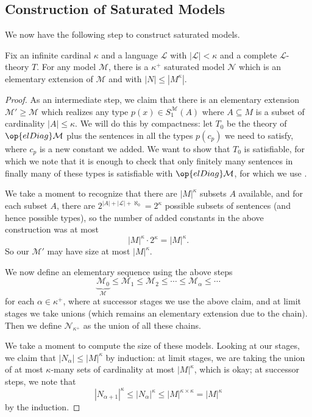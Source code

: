 \documentclass[../notes.tex]{subfiles}
\begin{document}
\subsection{Construction of Saturated Models}
We now have the following step to construct saturated models.
\begin{lemma} \label{lem:almost-saturated-model}
	Fix an infinite cardinal $\kappa$ and a language $\mathcal L$ with $\left|\mathcal L\right|<\kappa$ and a complete $\mathcal L$-theory $T$. For any model $\mathcal M$, there is a $\kappa^+$ saturated model $\mathcal N$ which is an elementary extension of $\mathcal M$ and with $\left|N\right|\le\left|M^\kappa\right|$.
\end{lemma}
\begin{proof}
	As an intermediate step, we claim that there is an elementary extension $\mathcal M'\ge\mathcal M$ which realizes any type $p(x)\in S_1^\mathcal M(A)$ where $A\subseteq M$ is a subset of cardinality $\left|A\right|\le\kappa$. We will do this by compactness: let $T_0$ be the theory of $\op{elDiag}\mathcal M$ plus the sentences in all the types $p(c_p)$ we need to satisfy, where $c_p$ is a new constant we added. We want to show that $T_0$ is satisfiable, for which we note that it is enough to check that only finitely many sentences in finally many of these types is satisfiable with $\op{elDiag}\mathcal M$, for which we use .
	
	We take a moment to recognize that there are $\left|M\right|^\kappa$ subsets $A$ available, and for each subset $A$, there are $2^{\left|A\right|+\left|\mathcal L\right|+\aleph_0}=2^\kappa$ possible subsets of sentences (and hence possible types), so the number of added constants in the above construction was at most
	\[\left|M\right|^\kappa\cdot2^\kappa=\left|M\right|^\kappa.\]
	So our $\mathcal M'$ may have size at most $\left|M\right|^\kappa$.

	We now define an elementary sequence using the above steps
	\[\underbrace{\mathcal M_0}_{\mathcal M}\le\mathcal M_1\le\mathcal M_2\le\cdots\le\mathcal M_\alpha\le\cdots\]
	for each $\alpha\in\kappa^+$, where at successor stages we use the above claim, and at limit stages we take unions (which remains an elementary extension due to the chain). Then we define $\mathcal N_{\kappa^+}$ as the union of all these chains.
	
	We take a moment to compute the size of these models. Looking at our stages, we claim that $\left|N_\alpha\right|\le\left|M\right|^\kappa$ by induction: at limit stages, we are taking the union of at most $\kappa$-many sets of cardinality at most $\left|M\right|^\kappa$, which is okay; at successor steps, we note that
	\[\left|N_{\alpha+1}\right|^\kappa\le\left|N_\alpha\right|^\kappa\le\left|M\right|^{\kappa\times\kappa}=\left|M\right|^{\kappa}\]
	by the induction.


\end{proof}
\end{document}
